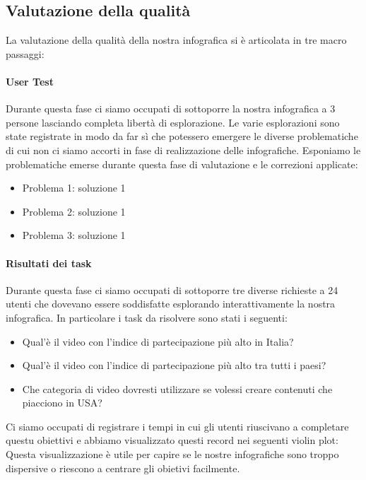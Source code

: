 \documentclass[10pt, a4paper,openany]{article}
\begin{document}
\subsection*{Valutazione della qualità}
La valutazione della qualità della nostra infografica si è articolata in tre macro passaggi:

\paragraph{User Test} Durante questa fase ci siamo occupati di sottoporre la nostra infografica a 3 persone lasciando completa libertà di esplorazione. Le varie esplorazioni sono state registrate in modo da far sì che potessero emergere le diverse problematiche di cui non ci siamo accorti in fase di realizzazione delle infografiche. Esponiamo le problematiche emerse durante questa fase di valutazione e le correzioni applicate:

\begin{itemize}
	\item Problema 1: soluzione 1
	\item Problema 2: soluzione 1
	\item Problema 3: soluzione 1
\end{itemize}
\paragraph{Risultati dei task} Durante questa fase ci siamo occupati di sottoporre tre diverse richieste a 24 utenti che dovevano essere soddisfatte esplorando interattivamente la nostra infografica. In particolare i task da risolvere sono stati i seguenti:
\begin{itemize}
	\item Qual'è il video con l'indice di partecipazione più alto in Italia?
	\item Qual'è il video con l'indice di partecipazione più alto tra tutti i paesi?
	\item Che categoria di video dovresti utilizzare se volessi creare contenuti che piacciono in USA?
\end{itemize}Ci siamo occupati di registrare i tempi in cui gli utenti riuscivano a completare questu obiettivi e abbiamo visualizzato questi record nei seguenti violin plot:
Questa visualizzazione è utile per capire se le nostre infografiche sono troppo dispersive o riescono a centrare gli obietivi facilmente.
\end{document}
